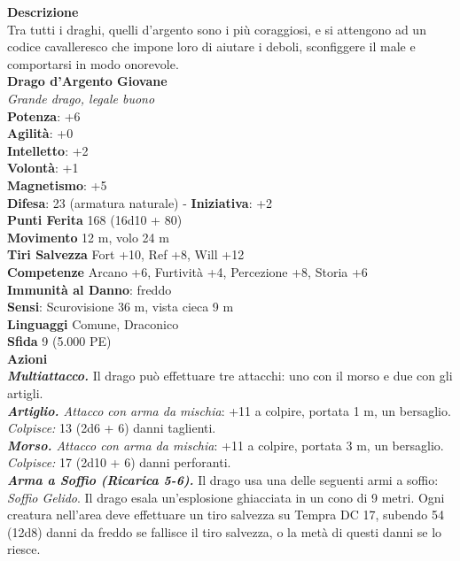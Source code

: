 \begin{multicols}{2}
\textbf{Descrizione}\\
Tra tutti i draghi, quelli d’argento sono i più coraggiosi, e si attengono ad un codice cavalleresco che impone loro di aiutare i deboli, sconfiggere il male e comportarsi in modo onorevole.\\
\medskip\textbf{Drago d'Argento Giovane}\\
\emph{Grande drago, legale buono}\\
\textbf{Potenza}: +6\\
\textbf{Agilità}: +0\\
\textbf{Intelletto}: +2\\
\textbf{Volontà}: +1\\
\textbf{Magnetismo}: +5\\
\textbf{Difesa}: 23 (armatura naturale) - \textbf{Iniziativa}: +2\\
\textbf{Punti Ferita} 168 (16d10 + 80)\\
\textbf{Movimento} 12 m, volo 24 m\\
\textbf{Tiri Salvezza} Fort +10, Ref +8, Will +12\\
\textbf{Competenze} Arcano +6, Furtività +4, Percezione +8, Storia +6\\
\textbf{Immunità al Danno}: freddo\\
\textbf{Sensi}: Scurovisione 36 m, vista cieca 9 m\\
\textbf{Linguaggi} Comune, Draconico\\
\textbf{Sfida} 9 (5.000 PE)\smallskip\\
\smallskip\textbf{Azioni}\\
\emph{\textbf{Multiattacco.}} Il drago può effettuare tre attacchi: uno con il morso e due con gli artigli.\\
\emph{\textbf{Artiglio.} Attacco con arma da mischia}: +11 a colpire, portata 1 m, un bersaglio.\\
\emph{Colpisce:} 13 (2d6 + 6) danni taglienti.\\
\emph{\textbf{Morso.} Attacco con arma da mischia}: +11 a colpire, portata 3 m, un bersaglio.\\
\emph{Colpisce:} 17 (2d10 + 6) danni perforanti.\\
\emph{\textbf{Arma a Soffio (Ricarica 5-6).}} Il drago usa una delle seguenti armi a soffio:\\
\emph{Soffio Gelido}. Il drago esala un'esplosione ghiacciata in un cono di 9 metri. Ogni creatura nell'area deve effettuare un tiro salvezza su Tempra DC 17, subendo 54 (12d8) danni da freddo se fallisce il tiro salvezza, o la metà di questi danni se lo riesce.\\

\end{multicols}
